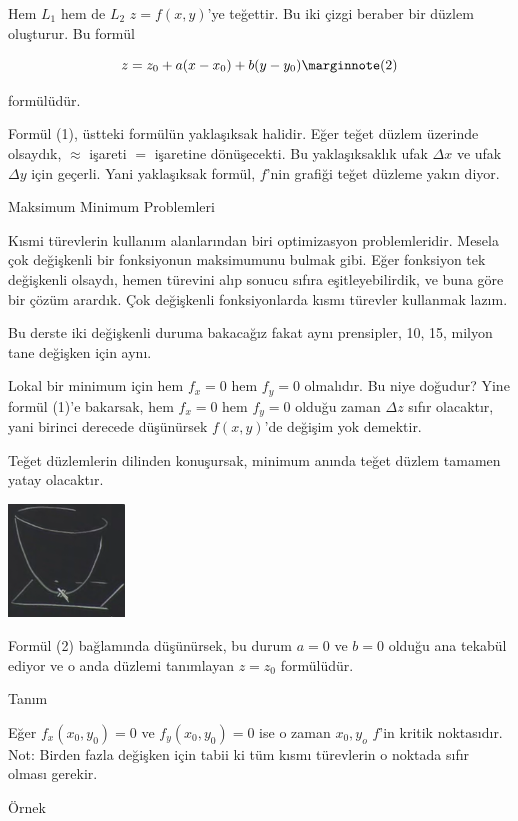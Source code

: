 \documentclass[12pt,fleqn]{article}\usepackage{../../common}
\begin{document}
Hem $L_1$ hem de $L_2$ $z = f(x,y)$'ye teğettir. Bu iki çizgi beraber bir düzlem
oluşturur. Bu formül

$$
z = z_0 + a(x-x_0) + b(y-y_0) 
\mlabel{2}
$$

formülüdür. 


Formül (1), üstteki formülün yaklaşıksak halidir. Eğer teğet düzlem
üzerinde olsaydık, $\approx$ işareti $=$ işaretine dönüşecekti. Bu
yaklaşıksaklık ufak $\Delta x$ ve ufak $\Delta y$ için geçerli. Yani
yaklaşıksak formül, $f$'nin grafiği teğet düzleme yakın diyor. 


Maksimum Minimum Problemleri 

Kısmi türevlerin kullanım alanlarından biri optimizasyon problemleridir. Mesela
çok değişkenli bir fonksiyonun maksimumunu bulmak gibi. Eğer fonksiyon tek
değişkenli olsaydı, hemen türevini alıp sonucu sıfıra eşitleyebilirdik, ve buna
göre bir çözüm arardık. Çok değişkenli fonksiyonlarda kısmı türevler kullanmak
lazım.

Bu derste iki değişkenli duruma bakacağız fakat aynı prensipler, 10, 15,
milyon tane değişken için aynı. 

Lokal bir minimum için hem $f_x=0$ hem $f_y=0$ olmalıdır. Bu niye doğudur? Yine
formül (1)'e bakarsak, hem $f_x=0$ hem $f_y=0$ olduğu zaman $\Delta z$ sıfır
olacaktır, yani birinci derecede düşünürsek $f(x,y)$'de değişim yok demektir.

Teğet düzlemlerin dilinden konuşursak, minimum anında teğet düzlem tamamen
yatay olacaktır. 

\begin{center}
\includegraphics[height=3cm]{9_3.png}
\end{center}

Formül (2) bağlamında düşünürsek, bu durum $a=0$ ve $b=0$ olduğu ana tekabül
ediyor ve o anda düzlemi tanımlayan $z = z_0$ formülüdür.

Tanım

Eğer $f_x(x_0,y_0)= 0$ ve $f_y(x_0,y_0)= 0$ ise o zaman $x_0,y_o$ $f$'in kritik
noktasıdır. Not: Birden fazla değişken için tabii ki tüm kısmı türevlerin o
noktada sıfır olması gerekir.

Örnek
\end{document}

